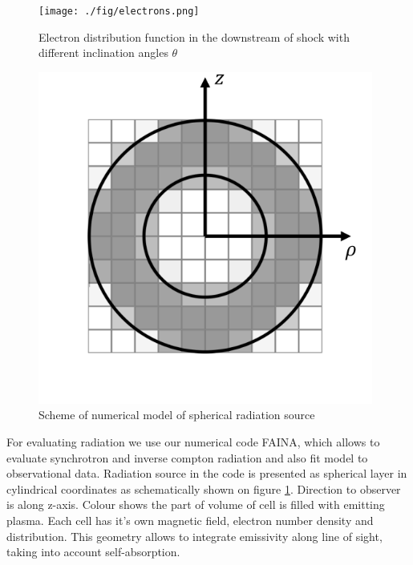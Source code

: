 \documentclass{article}
\begin{document}
	
	\begin{figure}
		\centering
		\begin{minipage}{0.48\textwidth}
			\centering
			\texttt{[image: ./fig/electrons.png]} 
			\caption{Electron distribution function in the downstream of shock with different inclination angles $\theta$}
			\label{distributions}
		\end{minipage}\hfill
		\begin{minipage}{0.48\textwidth}
			\centering
			\includegraphics[width=0.98\textwidth]{./fig/sphericalSource.png} 
			\caption{Scheme of numerical model of spherical radiation source}
			\label{sphericalSource}
		\end{minipage}
	\end{figure}
	
	For evaluating radiation we use our numerical code FAINA, which allows to evaluate synchrotron and inverse compton radiation and also fit model to observational data. Radiation source in the code is presented as spherical layer in cylindrical coordinates as schematically shown on figure \ref{sphericalSource}. Direction to observer is along z-axis. Colour shows the part of volume of cell is filled with emitting plasma. Each cell has it's own magnetic field, electron number density and distribution. This geometry allows to integrate emissivity along line of sight, taking into account self-absorption. 
	
\end{document}
